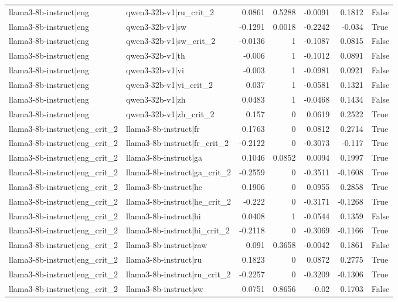 \begin{table}
\begin{tabular}{l l r r r r l}
llama3-8b-instruct|eng & qwen3-32b-v1|ru_crit_2 & 0.0861 & 0.5288 & -0.0091 & 0.1812 & False \\
llama3-8b-instruct|eng & qwen3-32b-v1|sw & -0.1291 & 0.0018 & -0.2242 & -0.034 & True \\
llama3-8b-instruct|eng & qwen3-32b-v1|sw_crit_2 & -0.0136 & 1 & -0.1087 & 0.0815 & False \\
llama3-8b-instruct|eng & qwen3-32b-v1|th & -0.006 & 1 & -0.1012 & 0.0891 & False \\
llama3-8b-instruct|eng & qwen3-32b-v1|vi & -0.003 & 1 & -0.0981 & 0.0921 & False \\
llama3-8b-instruct|eng & qwen3-32b-v1|vi_crit_2 & 0.037 & 1 & -0.0581 & 0.1321 & False \\
llama3-8b-instruct|eng & qwen3-32b-v1|zh & 0.0483 & 1 & -0.0468 & 0.1434 & False \\
llama3-8b-instruct|eng & qwen3-32b-v1|zh_crit_2 & 0.157 & 0 & 0.0619 & 0.2522 & True \\
llama3-8b-instruct|eng_crit_2 & llama3-8b-instruct|fr & 0.1763 & 0 & 0.0812 & 0.2714 & True \\
llama3-8b-instruct|eng_crit_2 & llama3-8b-instruct|fr_crit_2 & -0.2122 & 0 & -0.3073 & -0.117 & True \\
llama3-8b-instruct|eng_crit_2 & llama3-8b-instruct|ga & 0.1046 & 0.0852 & 0.0094 & 0.1997 & True \\
llama3-8b-instruct|eng_crit_2 & llama3-8b-instruct|ga_crit_2 & -0.2559 & 0 & -0.3511 & -0.1608 & True \\
llama3-8b-instruct|eng_crit_2 & llama3-8b-instruct|he & 0.1906 & 0 & 0.0955 & 0.2858 & True \\
llama3-8b-instruct|eng_crit_2 & llama3-8b-instruct|he_crit_2 & -0.222 & 0 & -0.3171 & -0.1268 & True \\
llama3-8b-instruct|eng_crit_2 & llama3-8b-instruct|hi & 0.0408 & 1 & -0.0544 & 0.1359 & False \\
llama3-8b-instruct|eng_crit_2 & llama3-8b-instruct|hi_crit_2 & -0.2118 & 0 & -0.3069 & -0.1166 & True \\
llama3-8b-instruct|eng_crit_2 & llama3-8b-instruct|raw & 0.091 & 0.3658 & -0.0042 & 0.1861 & False \\
llama3-8b-instruct|eng_crit_2 & llama3-8b-instruct|ru & 0.1823 & 0 & 0.0872 & 0.2775 & True \\
llama3-8b-instruct|eng_crit_2 & llama3-8b-instruct|ru_crit_2 & -0.2257 & 0 & -0.3209 & -0.1306 & True \\
llama3-8b-instruct|eng_crit_2 & llama3-8b-instruct|sw & 0.0751 & 0.8656 & -0.02 & 0.1703 & False \\

\end{tabular}
\end{table}
